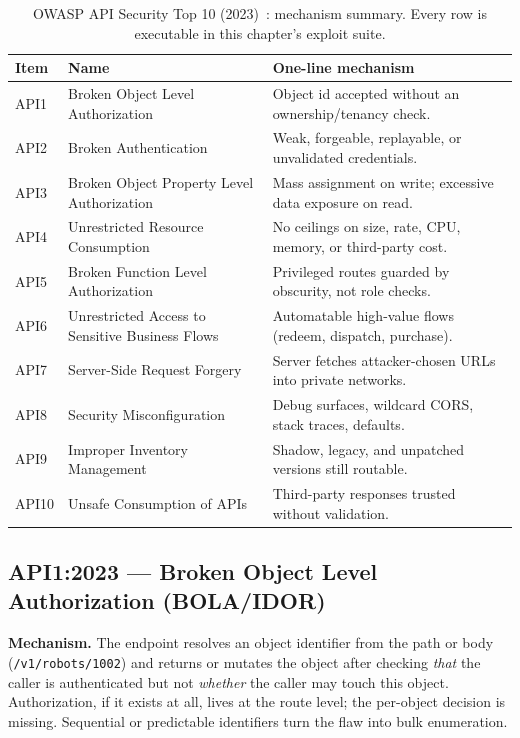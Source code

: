 \begin{table}[ht]
\centering\small
\begin{tabularx}{\textwidth}{l l X}
\toprule
\textbf{Item} & \textbf{Name} & \textbf{One-line mechanism} \\
\midrule
API1 & Broken Object Level Authorization & Object id accepted without an ownership/tenancy check. \\
API2 & Broken Authentication & Weak, forgeable, replayable, or unvalidated credentials. \\
API3 & Broken Object Property Level Authorization & Mass assignment on write; excessive data exposure on read. \\
API4 & Unrestricted Resource Consumption & No ceilings on size, rate, CPU, memory, or third-party cost. \\
API5 & Broken Function Level Authorization & Privileged routes guarded by obscurity, not role checks. \\
API6 & Unrestricted Access to Sensitive Business Flows & Automatable high-value flows (redeem, dispatch, purchase). \\
API7 & Server-Side Request Forgery & Server fetches attacker-chosen URLs into private networks. \\
API8 & Security Misconfiguration & Debug surfaces, wildcard CORS, stack traces, defaults. \\
API9 & Improper Inventory Management & Shadow, legacy, and unpatched versions still routable. \\
API10 & Unsafe Consumption of APIs & Third-party responses trusted without validation. \\
\bottomrule
\end{tabularx}
\caption{OWASP API Security Top 10 (2023)~\cite{owaspapisecurity}: mechanism
summary. Every row is executable in this chapter's exploit suite.}
\label{tab:ch16-owasp-map}
\end{table}

\subsection{API1:2023 --- Broken Object Level Authorization (BOLA/IDOR)}
\label{sec:ch16-api1}

\textbf{Mechanism.} The endpoint resolves an object identifier from the path
or body (\texttt{/v1/robots/1002}) and returns or mutates the object after
checking \emph{that} the caller is authenticated but not \emph{whether} the
caller may touch this object. Authorization, if it exists at all, lives at
the route level; the per-object decision is missing. Sequential or
predictable identifiers turn the flaw into bulk enumeration.

